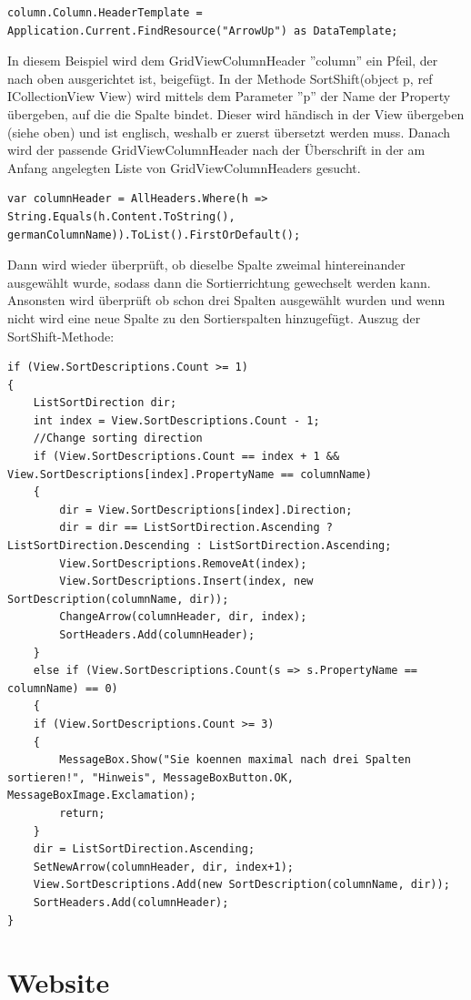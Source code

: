 \begin{lstlisting}
column.Column.HeaderTemplate = Application.Current.FindResource("ArrowUp") as DataTemplate;
\end{lstlisting}
In diesem Beispiel wird dem GridViewColumnHeader ''column'' ein Pfeil, der nach oben ausgerichtet ist, beigefügt. \newline
In der Methode SortShift(object p, ref ICollectionView View) wird mittels dem Parameter ''p'' der Name der Property übergeben, auf die die Spalte bindet. Dieser wird händisch in der View übergeben (siehe oben) und ist englisch, weshalb er zuerst übersetzt werden muss. Danach wird der passende GridViewColumnHeader nach der Überschrift in der am Anfang angelegten Liste von GridViewColumnHeaders gesucht.
\begin{lstlisting}
var columnHeader = AllHeaders.Where(h => String.Equals(h.Content.ToString(), germanColumnName)).ToList().FirstOrDefault();
\end{lstlisting}
Dann wird wieder überprüft, ob dieselbe Spalte zweimal hintereinander ausgewählt wurde, sodass dann die Sortierrichtung gewechselt werden kann. Ansonsten wird überprüft ob schon drei Spalten ausgewählt wurden und wenn nicht wird eine neue Spalte zu den Sortierspalten hinzugefügt.
Auszug der SortShift-Methode:

\begin{lstlisting}
if (View.SortDescriptions.Count >= 1)
{
	ListSortDirection dir;
	int index = View.SortDescriptions.Count - 1;
	//Change sorting direction
	if (View.SortDescriptions.Count == index + 1 && View.SortDescriptions[index].PropertyName == columnName)
	{
		dir = View.SortDescriptions[index].Direction;
		dir = dir == ListSortDirection.Ascending ? ListSortDirection.Descending : ListSortDirection.Ascending;
		View.SortDescriptions.RemoveAt(index);
		View.SortDescriptions.Insert(index, new SortDescription(columnName, dir));
		ChangeArrow(columnHeader, dir, index);
		SortHeaders.Add(columnHeader);
	}
	else if (View.SortDescriptions.Count(s => s.PropertyName == columnName) == 0)
	{
	if (View.SortDescriptions.Count >= 3)
	{
		MessageBox.Show("Sie koennen maximal nach drei Spalten sortieren!", "Hinweis", MessageBoxButton.OK, MessageBoxImage.Exclamation);
		return;
	}
	dir = ListSortDirection.Ascending;
	SetNewArrow(columnHeader, dir, index+1);
	View.SortDescriptions.Add(new SortDescription(columnName, dir));
	SortHeaders.Add(columnHeader);
}
\end{lstlisting}
\pagebreak 

\section{Website}
